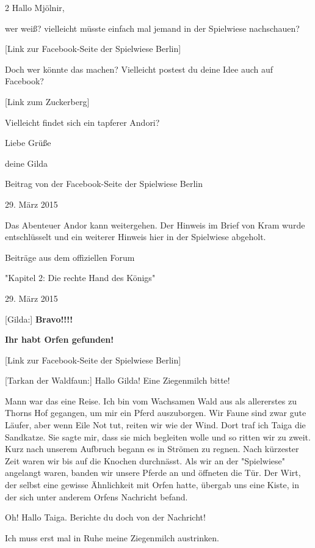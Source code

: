\documentclass[10pt, a4paper, oneside]{book}
\begin{document}
\begin{multicols}{2}
Hallo Mjölnir,

wer weiß? vielleicht müsste einfach mal jemand in der Spielwiese nachschauen?

[Link zur Facebook-Seite der Spielwiese Berlin]

Doch wer könnte das machen? Vielleicht postest du deine Idee auch auf Facebook?

[Link zum Zuckerberg]

Vielleicht findet sich ein tapferer Andori?

Liebe Grüße

deine Gilda

\begin{center}
    Beitrag von der Facebook-Seite der Spielwiese Berlin

    29. März 2015
\end{center}

Das Abenteuer Andor kann weitergehen. Der Hinweis im Brief von Kram wurde entschlüsselt und ein weiterer Hinweis hier in der Spielwiese abgeholt.


\begin{center}
    Beiträge aus dem offiziellen Forum

    "Kapitel 2: Die rechte Hand des Königs"

    29. März 2015
\end{center}

[Gilda:] \textbf{Bravo!!!!}

\textbf{Ihr habt Orfen gefunden!}

[Link zur Facebook-Seite der Spielwiese Berlin]

[Tarkan der Waldfaun:] Hallo Gilda! Eine Ziegenmilch bitte!

Mann war das eine Reise. Ich bin vom Wachsamen Wald aus als allererstes zu Thorns Hof gegangen, um mir ein Pferd auszuborgen. Wir Faune sind zwar gute Läufer, aber wenn Eile Not tut, reiten wir wie der Wind. Dort traf ich Taiga die Sandkatze. Sie sagte mir, dass sie mich begleiten wolle und so ritten wir zu zweit. Kurz nach unserem Aufbruch begann es in Strömen zu regnen. Nach kürzester Zeit waren wir bis auf die Knochen durchnässt. Als wir an der "Spielwiese" angelangt waren, banden wir unsere Pferde an und öffneten die Tür. Der Wirt, der selbst eine gewisse Ähnlichkeit mit Orfen hatte, übergab uns eine Kiste, in der sich unter anderem Orfens Nachricht befand.

Oh! Hallo Taiga. Berichte du doch von der Nachricht!

Ich muss erst mal in Ruhe meine Ziegenmilch austrinken.


\end{multicols}
\end{document}
